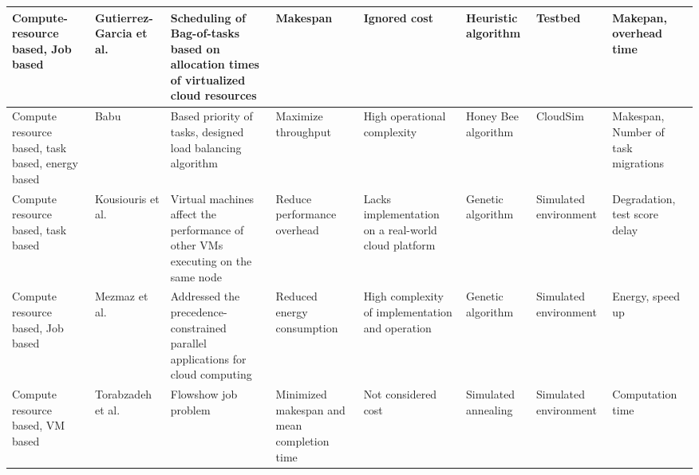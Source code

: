 \begin{table*}[!htbp]
{\begin{tabular}{|g{2cm} p{2cm} p{2cm} p{2cm} p{2cm} p{2cm} p{2cm} p{2cm}|}
 Compute-resource based, Job based & Gutierrez-Garcia et al.~\cite{gutierrez2013family} & Scheduling of Bag-of-tasks based on allocation times of virtualized cloud resources & Makespan & Ignored cost & Heuristic algorithm &  Testbed & Makepan, overhead time
\\ \hline

Compute resource based, task based, energy based & Babu~\cite{ld2013honey} & Based  priority of tasks, designed load balancing algorithm & Maximize throughput & High operational complexity & Honey Bee algorithm & CloudSim & Makespan, Number of task migrations 
\\ \hline

Compute resource based, task based & Kousiouris et al.~\cite{kousiouris2011effects}& Virtual machines affect the performance of other VMs executing on the same node & Reduce performance overhead & Lacks implementation on a real-world cloud platform  & Genetic algorithm  &  Simulated environment & Degradation, test score delay 
\\ \hline

Compute resource based, Job based & Mezmaz et al.~\cite{mezmaz2011parallel} & Addressed the precedence-constrained parallel applications for cloud computing & Reduced energy consumption & High complexity of implementation and operation& Genetic algorithm & Simulated environment & Energy, speed up 
\\ \hline


Compute resource based, VM based & Torabzadeh et al.~\cite{torabzadeh2010cloud} & Flowshow job problem  & Minimized makespan and mean completion time & Not considered cost & Simulated annealing & Simulated environment & Computation time 
\\ \hline


\end{tabular}
}

\end{table*}
